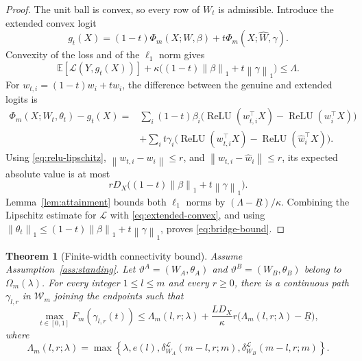 \documentclass[pdflatex,sn-mathphys-num]{sn-jnl}
\theoremstyle{thmstyleone}
\newtheorem{theorem}{Theorem}[section]
\theoremstyle{thmstyletwo}
\theoremstyle{thmstylethree}
\newcommand{\relu}{\operatorname{ReLU}}
\newcommand{\E}{\mathbb{E}}
\newcommand{\norm}[1]{\left\lVert #1 \right\rVert}
\begin{document}
\begin{proof}
The unit ball is convex, so every row of $W_t$ is admissible. Introduce the extended convex logit
\[
g_t(X)=(1-t)\Phi_m(X;W,\beta)
+t\Phi_m(X;\widehat W,\gamma).
\]
Convexity of the loss and of the $\ell_1$ norm gives
\begin{equation}
\E[\mathcal L(Y,g_t(X))]
+\kappa\big((1-t)\norm{\beta}_1+t\norm{\gamma}_1\big)
\le\Lambda.
\label{eq:extended-convex}
\end{equation}
For $w_{t,i}=(1-t)w_i+t\hat w_i$, the difference between the genuine and extended logits is
\begin{align*}
\Phi_m(X;W_t,\theta_t)-g_t(X)
={}&\sum_i(1-t)\beta_i
\bigl(\relu(w_{t,i}^\top X)-\relu(w_i^\top X)\bigr)\\
&+\sum_i t\gamma_i
\bigl(\relu(w_{t,i}^\top X)-\relu(\hat w_i^\top X)\bigr).
\end{align*}
Using \eqref{eq:relu-lipschitz}, $\norm{w_{t,i}-w_i}\le r$, and $\norm{w_{t,i}-\hat w_i}\le r$, its expected absolute value is at most
\[
rD_X\big((1-t)\norm{\beta}_1+t\norm{\gamma}_1\big).
\]
Lemma~\ref{lem:attainment} bounds both $\ell_1$ norms by $(\Lambda-\underline R)/\kappa$. Combining the Lipschitz estimate for $\mathcal L$ with \eqref{eq:extended-convex}, and using $\norm{\theta_t}_1\le(1-t)\norm{\beta}_1+t\norm{\gamma}_1$, proves \eqref{eq:bridge-bound}.
\end{proof}

\begin{theorem}[Finite-width connectivity bound]\label{thm:finite}
Assume Assumption~\ref{ass:standing}. Let $\vartheta^A=(W_A,\theta_A)$ and $\vartheta^B=(W_B,\theta_B)$ belong to $\Omega_m(\lambda)$. For every integer $1\le l\le m$ and every $r\ge0$, there is a continuous path $\gamma_{l,r}$ in $\mathcal W_m$ joining the endpoints such that
\begin{equation}
\max_{t\in[0,1]}F_m(\gamma_{l,r}(t))
\le
\Lambda_m(l,r;\lambda)
+\frac{LD_X}{\kappa}r
\bigl(\Lambda_m(l,r;\lambda)-\underline R\bigr),
\label{eq:finite-bound}
\end{equation}
where
\begin{equation}
\Lambda_m(l,r;\lambda)
=\max\!\left\{
\lambda,
e(l),
\delta_{W_A}^{\mathcal L}(m-l,r;m),
\delta_{W_B}^{\mathcal L}(m-l,r;m)
\right\}.
\label{eq:Lambda}
\end{equation}
\end{theorem}
\end{document}
